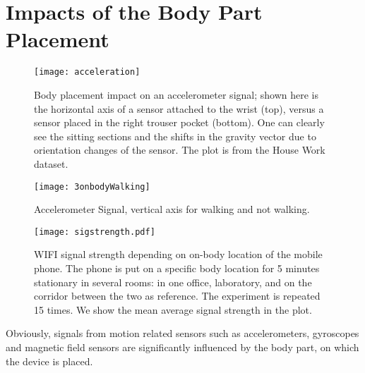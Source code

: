 


\section{Impacts of the Body Part Placement}
\begin{figure}[!t]
\centering
\texttt{[image: acceleration]}
\caption[Body placement impacts on an accelerometer]{Body placement impact on an accelerometer signal; shown here is the 
horizontal axis of a sensor attached to the wrist (top), 
versus a sensor placed in the right trouser pocket (bottom). 
One can clearly see the sitting sections and the shifts in the gravity vector 
due to orientation changes of the sensor. The plot is from the House Work dataset.}
\label{fig:obacceleration}
\end{figure}
\begin{figure}[!t]
\centering
\texttt{[image: 3onbodyWalking]}
\caption[Acceleration: Walking versus not walking]{Accelerometer Signal, vertical axis for walking and not walking.}
\label{fig:walking}
\end{figure}
\begin{figure}[t]
    \begin{center}
    \texttt{[image: sigstrength.pdf]}
	\end{center}
\caption[WIFI signal strength dependent on body placement]{WIFI signal strength depending on on-body location of the
  mobile phone. The phone is put on a specific body location for 5
  minutes stationary in several rooms: in one office, laboratory, and on
  the corridor between the two as reference. The experiment is
  repeated 15 times. We show the mean average signal strength in the
  plot.}  \label{fig:sigstrength}
\end{figure}
Obviously, signals from motion related sensors such as accelerometers,
gyroscopes and magnetic field sensors are significantly
influenced by the body part, on which the device is placed.  

